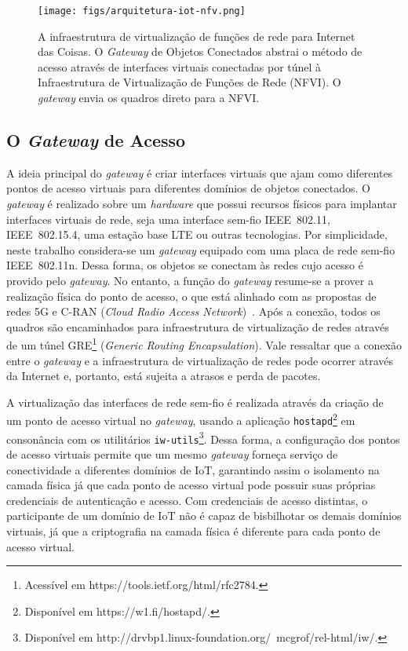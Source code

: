 \documentclass[12pt]{article}
\begin{document}
\begin{figure}
\begin{center}
 \texttt{[image: figs/arquitetura-iot-nfv.png]}
 \end{center}
\vspace{-3mm}
\caption{A infraestrutura de virtualização de funções de rede para Internet das Coisas. O \textit{Gateway} de Objetos Conectados abstrai o método de acesso através de interfaces virtuais conectadas por túnel à Infraestrutura de Virtualização de Funções de Rede (NFVI). O \textit{gateway} envia os quadros direto para a NFVI. %
} 
\label{fig:arch}
\vspace{-3mm}
\end{figure}

\subsection{O \textit{Gateway} de Acesso}

A ideia principal do \textit{gateway} é criar interfaces virtuais que ajam como diferentes pontos de acesso virtuais para diferentes domínios de objetos conectados. O {\it gateway} é realizado sobre um {\it hardware} que possui recursos físicos para implantar interfaces virtuais de rede, seja uma interface sem-fio IEEE~802.11, IEEE~802.15.4, uma estação base LTE ou outras tecnologias. Por simplicidade, neste trabalho considera-se um {\it gateway} equipado com uma placa de rede sem-fio IEEE~802.11n. Dessa forma, os objetos se conectam às redes cujo acesso é provido pelo {\it gateway}. No entanto, a função do {\it gateway} resume-se a prover a realização física do ponto de acesso, o que está alinhado com as propostas de redes 5G e C-RAN ({\it Cloud Radio Access Network})~\cite{cran}. Após a conexão, todos os quadros são encaminhados para infraestrutura de virtualização de redes através de um túnel GRE\footnote{Acessível em https://tools.ietf.org/html/rfc2784.} (\textit{Generic Routing Encapsulation}). Vale ressaltar que a conexão entre o {\it gateway} e a infraestrutura de virtualização de redes pode ocorrer através da Internet e, portanto, está sujeita a atrasos e perda de pacotes. 

A virtualização das interfaces de rede sem-fio é realizada através da criação de um ponto de acesso virtual no \textit{gateway}, usando a aplicação \texttt{hostapd}\footnote{Disponível em https://w1.fi/hostapd/.} em consonância com os utilitários \texttt{iw-utils}\footnote{Disponível em http://drvbp1.linux-foundation.org/~mcgrof/rel-html/iw/.}. Dessa forma, a configuração dos pontos de acesso virtuais permite que um mesmo \textit{gateway} forneça serviço de conectividade a diferentes domínios de IoT, garantindo assim o isolamento na camada física já que cada ponto de acesso virtual pode possuir suas próprias credenciais de autenticação e acesso. Com credenciais de acesso distintas, o participante de um domínio de IoT não é capaz de bisbilhotar os demais domínios virtuais, já que a criptografia na camada física é diferente para cada ponto de acesso virtual.
\end{document}
